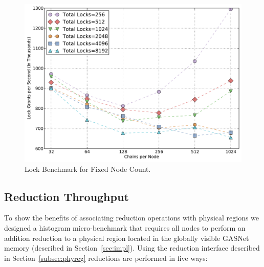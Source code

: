 \begin{figure}
\begin{center}
\includegraphics[scale=0.33]{figs/fixed_node_lock.pdf}
\end{center}
\vspace{-6mm}
\caption{Lock Benchmark for Fixed Node Count.\label{fig:fixednode}}
\vspace{-4mm}
\end{figure}


\subsection{Reduction Throughput}
\label{subsec:reducmicro}
To show the benefits of associating reduction operations with physical regions we designed
a histogram micro-benchmark that requires all nodes to perform an addition reduction to a
physical region located in the globally visible GASNet memory (described in 
Section~\ref{sec:impl}).  Using the reduction interface described in Section~\ref{subsec:phyreg}
reductions are performed in five ways:

